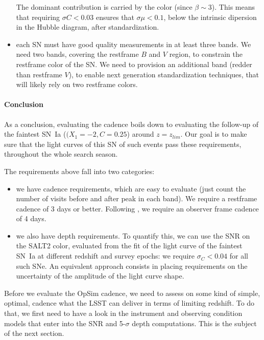 \documentclass[\docopts]{\docclass}
\begin{document}
\begin{itemize}
  The dominant contribution is carried by the color (since
  $\beta \sim 3$). This means that requiring $\sigma C < 0.03$ ensures
  that $\sigma \mu < 0.1$, below the intrinsic dipersion in the Hubble
  diagram, after standardization.

\item each SN must have good quality measurements in at least three
  bands. We need two bands, covering the restframe $B$ and $V$ region,
  to constrain the restframe color of the SN. We need to provision an
  additional band (redder than restframe $V$), to enable next
  generation standardization techniques, that will likely rely on two
  restframe colors.
\end{itemize}


\paragraph{Conclusion} As a conclusion, evaluating the cadence boils
down to evaluating the follow-up of the faintest SN~Ia ($(X_1=-2,
C=0.25$) around $z = z_{lim}$. Our goal is to make sure that the light
curves of this SN of such events pass these requirements, throughout
the whole search season.

The requirements above fall into two categories: 
\begin{itemize}
\item we have  cadence requirements, which are easy  to evaluate (just
  count the number of visits before  and after peak in each band).  We
  require  a  restframe  cadence  of  3  days  or  better.   Following
  \cite{2014A&A...572A..80A}, we require an  observer frame cadence of
  4 days.

\item we also have depth requirements.  To quantify this, we can use
  the SNR on the SALT2 color, evaluated from the fit of the light
  curve of the faintest SN~Ia at different redshift and survey epochs:
  we require $\sigma_C < 0.04$ for all such SNe.  An equivalent
  approach consists in placing requirements on the uncertainty of the
  amplitude of the light curve shape.  
\end{itemize}


Before we evaluate the OpSim cadence, we need to assess on some kind
of simple, optimal, cadence what the LSST can deliver in terms of
limiting redshift. To do that, we first need to have a look in the
instrument and observing condition models that enter into the SNR and
5-$\sigma$ depth computations. This is the subject of the next
section.
\end{document}
